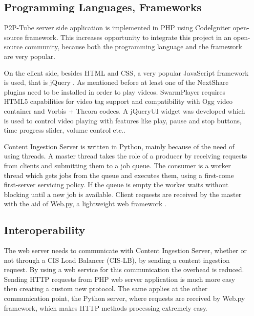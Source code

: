 %
%
\subsection{Programming Languages, Frameworks}
\label{subsec:langs-and-frameworks}

P2P-Tube server side application is implemented in PHP using CodeIgniter \cite{code-igniter} open-source framework. This increases opportunity to integrate this project in an open-source community, because both the programming language and the framework are very popular.

On the client side, besides HTML and CSS, a very popular JavaScript framework is used, that is jQuery \cite{jquery}. As mentioned before at least one of the NextShare plugins need to be installed in order to play videos. SwarmPlayer requires HTML5 capabilities for video tag support and compatibility with Ogg video container and Vorbis + Theora codecs. A jQueryUI \cite{jqueryui} widget was developed which is used to control video playing with features like play, pause and stop buttons, time progress slider, volume control etc..

Content Ingestion Server is written in Python, mainly because of the need of using threads. A master thread takes the role of a producer by receiving requests from clients and submitting them to a job queue. The consumer is a worker thread which gets jobs from the queue and executes them, using a first-come first-server servicing policy. If the queue is empty the worker waits without blocking until a new job is available. Client requests are received by the master with the aid of Web.py, a lightweight web framework \cite{webpy}.

\subsection{Interoperability}
\label{subsec:interoperability}

The web server needs to communicate with Content Ingestion Server, whether or not through a CIS Load Balancer (CIS-LB), by sending a content ingestion request. By using a web service for this communication the overhead is reduced. Sending HTTP requests from PHP web server application is much more easy then creating a custom new protocol. The same applies at the other communication point, the Python server, where requests are received by Web.py framework, which makes HTTP methods processing extremely easy.

